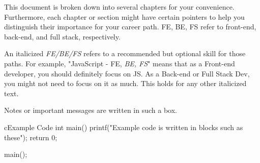   This document is broken down into several chapters for your convenience. Furthermore, each chapter or section might have certain pointers to help you distinguish their importance for your career path. FE, BE, FS refer to front-end, back-end, and full stack, respectively. 
    
    An italicized \emph{FE/BE/FS} refers to a recommended but optional skill for those paths. For example, "JavaScript - FE, \emph{BE, FS}" means that as a Front-end developer, you should definitely focus on JS. As a Back-end or Full Stack Dev, you might not need to focus on it as much. This holds for any other italicized text.
    
    \begin{tcolorbox}
        Notes or important messages are written in such a box.
    \end{tcolorbox}

    \begin{codeBlock}{c}{Example Code}
        int main(){
            printf("Example code is written in blocks such as these");
            return 0;
        }
        
        main();
    \end{codeBlock}